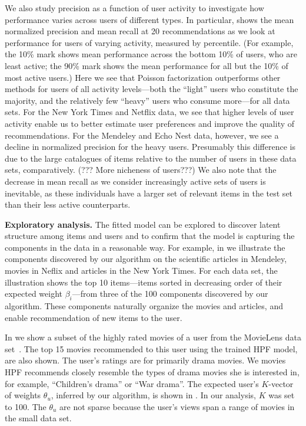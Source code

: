 We also study precision as a function of user activity to investigate
how performance varies across users of different types. In particular,
 shows the mean normalized
precision and mean recall at 20 recommendations as we look at
performance for users of varying activity, measured by
percentile. (For example, the 10\% mark shows mean performance across
the bottom 10\% of users, who are least active; the 90\% mark shows
the mean performance for all but the 10\% of most active users.) Here
we see that Poisson factorization outperforms other methods for users
of all activity levels---both the ``light'' users who constitute the
majority, and the relatively few ``heavy'' users who consume
more---for all data sets. For the New York Times and Netflix data, we
see that higher levels of user activity enable us to better estimate
user preferences and improve the quality of recommendations. For the
Mendeley and Echo Nest data, however, we see a decline in normalized
precision for the heavy users. Presumably this difference is due to
the large catalogues of items relative to the number of users in these
data sets, comparatively. (??? More nicheness of users???) We also
note that the decrease in mean recall as we consider increasingly
active sets of users is inevitable, as these individuals have a larger
set of relevant items in the test set than their less active
counterparts.

{\bf Exploratory analysis.} The fitted model can be explored to
discover latent structure among items and users and to confirm that
the model is capturing the components in the data in a reasonable
way. For example, in  we illustrate the components
discovered by our algorithm on the scientific articles in Mendeley,
movies in Neflix and articles in the New York Times. For each data
set, the illustration shows the top 10 items---items sorted in
decreasing order of their expected weight $\beta_i$---from three of
the 100 components discovered by our algorithm. These components
naturally organize the movies and articles, and enable recommendation
of new items to the user.

In  we show a subset of the highly rated
movies of a user from the MovieLens data
set~\cite{Herlocker:1999}. The top 15 movies recommended to this user
using the trained HPF model, are also shown. The user's ratings are
for primarily drama movies. We movies HPF recommends closely resemble
the types of drama movies she is interested in, for example,
``Children's drama'' or ``War drama''. The expected user's $K$-vector
of weights $\theta_u$, inferred by our algorithm, is shown in
. In our analysis, $K$ was set to
100. The $\theta_u$ are not sparse because the user's views span a
range of movies in the small data set.

